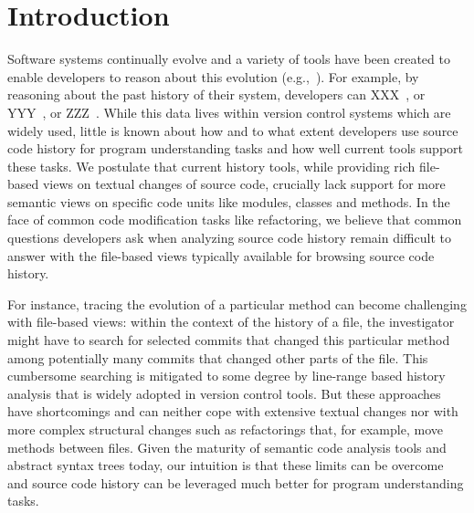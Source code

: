 
\section{Introduction}
\label{sec:introduction}


Software systems continually evolve and a variety of tools have been created to enable developers to reason about this evolution (e.g.,~\cite{XXX,XXX,XXX}).
For example, by reasoning about the past history of their system, developers can XXX~\cite{XXX}, or YYY~\cite{XXX}, or ZZZ~\cite{XXX}.
While this data lives within version control systems which are widely used, little is known about how and to what extent developers use source code history for program understanding tasks and how well current tools support these tasks. 
We postulate that current history tools, while providing rich file-based views on textual changes of source code, crucially lack support for more semantic views on specific code units like modules, classes and methods. 
In the face of common code modification tasks like refactoring, we believe that common questions developers ask when analyzing source code history remain difficult to answer with the file-based views typically available for browsing source code history. 

For instance, tracing the evolution of a particular method can become challenging with file-based views: within the context of the history of a file, the investigator might have to search for selected commits that changed this particular method among potentially many commits that changed other parts of the file. 
This cumbersome searching is mitigated to some degree by line-range based history analysis that is widely adopted in version control tools. 
But these  approaches have shortcomings and can neither cope with extensive textual changes nor with more complex structural changes such as refactorings that, for example, move methods between files. 
Given the maturity of semantic code analysis tools and abstract syntax trees today, our intuition is that these limits can be overcome and source code history can be leveraged much better for program understanding tasks.



